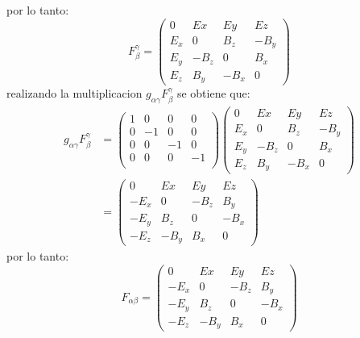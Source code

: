 por lo tanto:
\begin{equation*}
    F^{\gamma}_\beta = \left( \begin{matrix}
        0 & Ex & Ey   & Ez \\
        E_x &  0  & B_z & -B_y \\
        E_y & -B_z & 0 &B_x \\
        E_z & B_y & -B_x & 0  
    \end{matrix}\right)
\end{equation*}
realizando la multiplicacion $g_{\alpha\gamma}F^{\gamma}_\beta$ se obtiene que:
\begin{align*}
    g_{\alpha\gamma}F^{\gamma}_\beta &= \left(\begin{matrix}
        1 & 0 & 0 & 0\\
        0 & -1 & 0 & 0\\
        0 & 0 & -1 & 0\\
        0 & 0 & 0 & -1\\
    \end{matrix}\right)\left( \begin{matrix}
        0 & Ex & Ey   & Ez \\
        E_x &  0  & B_z & -B_y \\
        E_y & -B_z & 0 &B_x \\
        E_z & B_y & -B_x & 0  
    \end{matrix}\right) \\
    & = \left( \begin{matrix}
        0 & Ex & Ey   & Ez \\
        -E_x &  0  & -B_z & B_y \\
        -E_y & B_z & 0 &-B_x \\
        -E_z & -B_y & B_x & 0  
    \end{matrix}\right)
\end{align*}
por lo tanto:
\begin{equation*}
    F_{\alpha \beta} = \left( \begin{matrix}
        0 & Ex & Ey   & Ez \\
        -E_x &  0  & -B_z & B_y \\
        -E_y & B_z & 0 &-B_x \\
        -E_z & -B_y & B_x & 0  
    \end{matrix}\right)
\end{equation*}